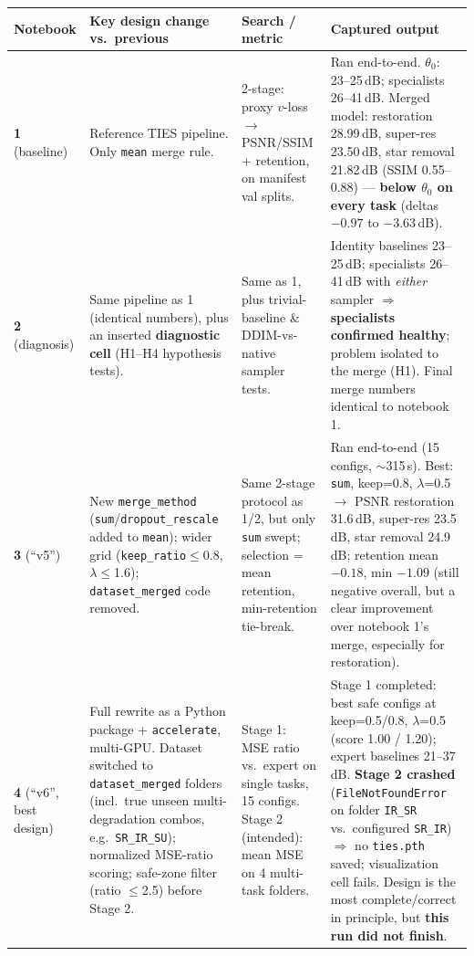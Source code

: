 \documentclass[11pt]{article}
\begin{document}
\begin{table}[htbp]
\centering
\small
\renewcommand{\arraystretch}{1.3}
\begin{tabular}{@{}p{1.7cm}p{4.3cm}p{4.3cm}p{4.9cm}@{}}
\toprule
\textbf{Notebook} & \textbf{Key design change vs.\ previous} & \textbf{Search / metric} & \textbf{Captured output} \\
\midrule

\textbf{1} \newline (baseline) &
Reference TIES pipeline. Only \texttt{mean} merge rule. &
2-stage: proxy $v$-loss $\to$ PSNR/SSIM + retention, on manifest val splits. &
Ran end-to-end. $\theta_0$: 23--25\,dB; specialists 26--41\,dB. Merged model: restoration 28.99\,dB, super-res 23.50\,dB, star removal 21.82\,dB (SSIM 0.55--0.88) — \textbf{below $\theta_0$ on every task} (deltas $-0.97$ to $-3.63$\,dB). \\

\textbf{2} \newline (diagnosis) &
Same pipeline as 1 (identical numbers), plus an inserted \textbf{diagnostic cell} (H1--H4 hypothesis tests). &
Same as 1, plus trivial-baseline \& DDIM-vs-native sampler tests. &
Identity baselines 23--25\,dB; specialists 26--41\,dB with \emph{either} sampler $\Rightarrow$ \textbf{specialists confirmed healthy}; problem isolated to the merge (H1). Final merge numbers identical to notebook 1. \\

\textbf{3} \newline (``v5'') &
New \texttt{merge\_method} (\texttt{sum}/\texttt{dropout\_rescale} added to \texttt{mean}); wider grid (\texttt{keep\_ratio}$\le$0.8, $\lambda\le$1.6); \texttt{dataset\_merged} code removed. &
Same 2-stage protocol as 1/2, but only \texttt{sum} swept; selection = mean retention, min-retention tie-break. &
Ran end-to-end (15 configs, $\sim$315\,s). Best: \texttt{sum}, keep=0.8, $\lambda$=0.5 $\to$ PSNR restoration 31.6\,dB, super-res 23.5\,dB, star removal 24.9\,dB; retention mean $-0.18$, min $-1.09$ (still negative overall, but a clear improvement over notebook 1's merge, especially for restoration). \\

\textbf{4} \newline (``v6'', best design) &
Full rewrite as a Python package + \texttt{accelerate}, multi-GPU. Dataset switched to \texttt{dataset\_merged} folders (incl.\ true unseen multi-degradation combos, e.g.\ \texttt{SR\_IR\_SU}); normalized MSE-ratio scoring; safe-zone filter (ratio $\le$2.5) before Stage 2. &
Stage 1: MSE ratio vs.\ expert on single tasks, 15 configs. Stage 2 (intended): mean MSE on 4 multi-task folders. &
Stage 1 completed: best safe configs at keep=0.5/0.8, $\lambda$=0.5 (score 1.00 / 1.20); expert baselines 21--37\,dB. \textbf{Stage 2 crashed} (\texttt{FileNotFoundError} on folder \texttt{IR\_SR} vs.\ configured \texttt{SR\_IR}) $\Rightarrow$ no \texttt{ties.pth} saved; visualization cell fails. Design is the most complete/correct in principle, but \textbf{this run did not finish}. \\


\end{tabular}
\end{table}
\end{document}
